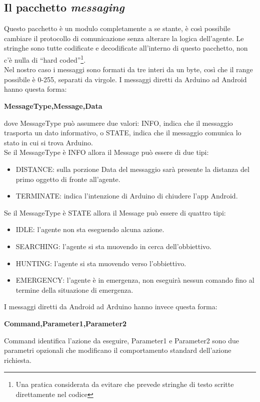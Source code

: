 \subsection{Il pacchetto \textit{messaging}}
Questo pacchetto è un modulo completamente a se stante, è così possibile cambiare il
 protocollo di comunicazione senza alterare la logica dell'agente. Le stringhe sono 
 tutte codificate e decodificate all'interno di questo pacchetto, non c'è nulla di 
 ``hard coded''\footnote{Una pratica considerata da evitare che prevede stringhe di 
 testo scritte direttamente nel codice}.
 \\ Nel nostro caso i messaggi sono formati da tre interi da un byte, così che il 
 range possibile è 0-255, separati da virgole.
 I messaggi diretti da Arduino ad Android hanno questa forma:
 \begin{center}
 \textbf{MessageType,Message,Data}
 \end{center}
 dove MessageType può assumere due valori: INFO, indica che il messaggio trasporta un
 dato informativo, o STATE, indica che il messaggio comunica lo stato in cui si trova Arduino.
 \\Se il MessageType è INFO allora il Message può essere di due tipi: 
 \begin{itemize}\item DISTANCE: sulla porzione Data del messaggio sarà presente 
 la distanza del primo oggetto di fronte all'agente.
 \item TERMINATE: indica l'intenzione di Arduino di chiudere l'app Android.
 \end{itemize}
 Se il MessageType è STATE allora il Message può essere di quattro tipi: 
 \begin{itemize}
 	\item IDLE: l'agente non sta eseguendo alcuna azione.
 	\item SEARCHING: l'agente si sta muovendo in cerca dell'obbiettivo.
 	\item HUNTING: l'agente si sta muovendo verso l'obbiettivo.
 	\item EMERGENCY: l'agente è in emergenza, non eseguirà nessun comando fino al 
 	termine della situazione di emergenza. 
 \end{itemize}
  I messaggi diretti da Android ad Arduino hanno invece questa forma:
 \begin{center}
 \textbf{Command,Parameter1,Parameter2}
 \end{center}
 Command identifica l'azione da eseguire, Parameter1 e Parameter2 sono due parametri opzionali
 che modificano il comportamento standard dell'azione richiesta.
